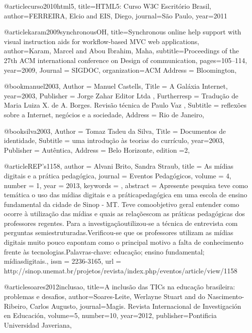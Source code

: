 @article{curso2010html5,
	title={HTML5: Curso W3C Escrit{\'o}rio Brasil},
	author={FERREIRA, Elcio and EIS, Diego},
	journal={S{\~a}o Paulo},
	year={2011}
}



@article{karam2009synchronousOH,
	title={Synchronous online help support with visual instruction aids for workflow-based MVC web applications},
	author={Karam, Marcel and Abou Ibrahim, Maha},
	subtitle={Proceedings of the 27th ACM international conference on Design of communication},
	pages={105--114},
	year={2009},
	Journal = {SIGDOC},
	organization={ACM}
	Address = {Bloomington},
}


@book{manuel2003,
	Author = {Manuel Castells},
	Title = {A Galáxia Internet},
	year={2003},
	Publisher = {Jorge Zahar Editor Ltda },
	Furtherresp = {Tradução de Maria Luiza X. de A. Borges. Revisão técnica de Paulo Vaz },
	Subtitle = {reflexões sobre a Internet, negócios e a sociedade},
	Address = {Rio de Janeiro},
}

@book{silva2003,
	Author = {Tomaz Tadeu da Silva},
	Title = { Documentos de identidade},
	Subtitle = {uma introdução às teorias do
		currículo},
	year={2003},
	Publisher = {Autêntica},
	Address = {Belo Horizonte},
	edition ={2},
}


@article{REP's1158,
	author = {Alvani Brito, Sandra Straub},
	title = {As mídias digitais e a prática pedagógica},
	journal = {Eventos Pedagógicos},
	volume = {4},
	number = {1},
	year = {2013},
	keywords = {},
	abstract = {Apresente pesquisa teve como temática o uso das mídias digitais e a práticapedagógica em uma escola de ensino fundamental da cidade de Sinop - MT. Teve comoobjetivo geral entender como ocorre à utilização das mídias e quais as relaçõescom as práticas pedagógicas dos professores regentes. Para a investigaçãoutilizou-se a técnica de entrevista com perguntas semiestruturadas.Verificou-se que os professores utilizam as mídias digitais muito pouco eapontam como o principal motivo a falta de conhecimento frente às tecnologias.Palavras-chave: educação; ensino fundamental; mídiasdigitais.},
	issn = {2236-3165},	url = {http://sinop.unemat.br/projetos/revista/index.php/eventos/article/view/1158}
}

@article{soares2012inclusao,
	title={A inclus{\~a}o das TICs na educa{\c{c}}{\~a}o brasileira: problemas e desafios},
	author={Soares-Leite, Werlayne Stuart and do Nascimento-Ribeiro, Carlos Augusto},
	journal={Magis. Revista Internacional de Investigaci{\'o}n en Educaci{\'o}n},
	volume={5},
	number={10},
	year={2012},
	publisher={Pontificia Universidad Javeriana},
}

